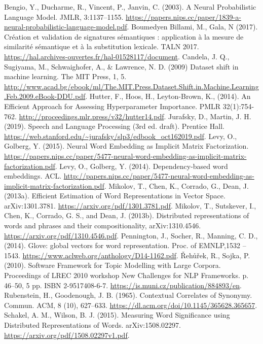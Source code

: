 \documentclass[11pt,french,french]{article}
\begin{document}
\begin{thebibliography}{999}
 Bengio, Y., Ducharme, R., Vincent, P., Janvin, C. (2003). A Neural Probabilistic Language Model. JMLR, 3:1137–1155. \url{https://papers.nips.cc/paper/1839-a-neural-probabilistic-language-model.pdf}.
 Boumedyen Billami, M.,  Gala, N (2017). Création et validation de signatures sémantiques : application à la mesure de similarité sémantique et à la substitution lexicale. TALN 2017. \url{https://hal.archives-ouvertes.fr/hal-01528117/document}.
 Candela, J. Q., Sugiyama, M., Schwaighofer, A., \& Lawrence, N. D. (2009) Dataset shift in machine learning. The MIT Press, 1, 5. \url{http://www.acad.bg/ebook/ml/The.MIT.Press.Dataset.Shift.in.Machine.Learning.Feb.2009.eBook-DDU.pdf}.
 Hutter, F., Hoos, H., Leyton-Brown, K., (2014). An Efficient Approach for Assessing Hyperparameter Importance. PMLR 32(1):754-762. \url{http://proceedings.mlr.press/v32/hutter14.pdf}.
 Jurafsky, D., Martin, J. H. (2019). Speech and Language Processing (3rd ed. draft). Prentice Hall. \url{https://web.stanford.edu/~jurafsky/slp3/edbook_oct162019.pdf}.
 Levy, O., Golberg, Y. (2015). Neural Word Embedding as Implicit Matrix Factorization.
\url{https://papers.nips.cc/paper/5477-neural-word-embedding-as-implicit-matrix-factorization.pdf}.
 Levy, O., Golberg, Y. (2014). Dependency-based word embeddings. ACL. \url{http://papers.nips.cc/paper/5477-neural-word-embedding-as-implicit-matrix-factorization.pdf}.
 Mikolov, T.,  Chen, K., Corrado, G., Dean, J. (2013a). Efficient Estimation of Word Representations in Vector Space. arXiv:1301.3781. \url{https://arxiv.org/pdf/1301.3781.pdf}.
 Mikolov, T., Sutskever, I., Chen, K., Corrado, G. S., and Dean, J. (2013b). Distributed representations of words and phrases and their compositionality, arXiv:1310.4546. \url{https://arxiv.org/pdf/1310.4546.pdf}.
 Pennington, J., Socher, R., Manning, C. D., (2014).  Glove: global vectors for word representation. Proc. of EMNLP,1532 – 1543. \url{https://www.aclweb.org/anthology/D14-1162.pdf}.
 {\v R}eh{\r u}{\v r}ek, R.,  Sojka, P. (2010). Software Framework for Topic Modelling with Large Corpora. Proceedings of LREC 2010 workshop New Challenges for NLP Frameworks. p. 46--50, 5 pp. ISBN 2-9517408-6-7. \url{https://is.muni.cz/publication/884893/en}.
 Rubenstein, H.,  Goodenough, J. B. (1965). Contextual Correlates of Synonymy. Commun. ACM, 8 (10), 627–633. \url{https://dl.acm.org/doi/10.1145/365628.365657}.
 Schakel, A. M., Wilson, B. J. (2015). Measuring Word Significance using Distributed Representations of Words. arXiv:1508.02297. \url{https://arxiv.org/pdf/1508.02297v1.pdf}.
\end{thebibliography}
\end{document}
